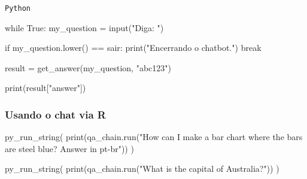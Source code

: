 \documentclass[
  letterpaper,
  DIV=11,
  numbers=noendperiod]{scrartcl}
\newenvironment{Shaded}{\begin{snugshade}}{\end{snugshade}}
\newcommand{\BuiltInTok}[1]{\textcolor[rgb]{0.00,0.23,0.31}{#1}}
\newcommand{\ControlFlowTok}[1]{\textcolor[rgb]{0.00,0.23,0.31}{#1}}
\newcommand{\FunctionTok}[1]{\textcolor[rgb]{0.28,0.35,0.67}{#1}}
\newcommand{\NormalTok}[1]{\textcolor[rgb]{0.00,0.23,0.31}{#1}}
\newcommand{\OperatorTok}[1]{\textcolor[rgb]{0.37,0.37,0.37}{#1}}
\newcommand{\StringTok}[1]{\textcolor[rgb]{0.13,0.47,0.30}{#1}}
\newcommand{\VariableTok}[1]{\textcolor[rgb]{0.07,0.07,0.07}{#1}}
\begin{document}
\begin{codelisting}

\caption{\texttt{Python}}

\begin{Shaded}
\begin{Highlighting}[]
\ControlFlowTok{while} \VariableTok{True}\NormalTok{:}
\NormalTok{  my\_question }\OperatorTok{=} \BuiltInTok{input}\NormalTok{(}\StringTok{"Diga: "}\NormalTok{)}
  
  \ControlFlowTok{if}\NormalTok{ my\_question.lower() }\OperatorTok{==} \StringTok{\textquotesingle{}sair\textquotesingle{}}\NormalTok{:}
    \BuiltInTok{print}\NormalTok{(}\StringTok{"Encerrando o chatbot."}\NormalTok{)}
    \ControlFlowTok{break}
          
\NormalTok{  result }\OperatorTok{=}\NormalTok{ get\_answer(my\_question, }\StringTok{"abc123"}\NormalTok{)}
  
  \BuiltInTok{print}\NormalTok{(result[}\StringTok{"answer"}\NormalTok{])}
\end{Highlighting}
\end{Shaded}

\end{codelisting}

\hypertarget{usando-o-chat-via-r}{%
\subsubsection{Usando o chat via R}\label{usando-o-chat-via-r}}

\begin{Shaded}
\begin{Highlighting}[]
\FunctionTok{py\_run\_string}\NormalTok{(}\StringTok{\textquotesingle{}}
\StringTok{print(qa\_chain.run("How can I make a bar chart where the bars are steel blue? Answer in pt{-}br"))}
\StringTok{\textquotesingle{}}\NormalTok{)}

\FunctionTok{py\_run\_string}\NormalTok{(}\StringTok{\textquotesingle{}}
\StringTok{print(qa\_chain.run("What is the capital of Australia?"))}
\StringTok{\textquotesingle{}}\NormalTok{)}
\end{Highlighting}
\end{Shaded}
\end{document}
